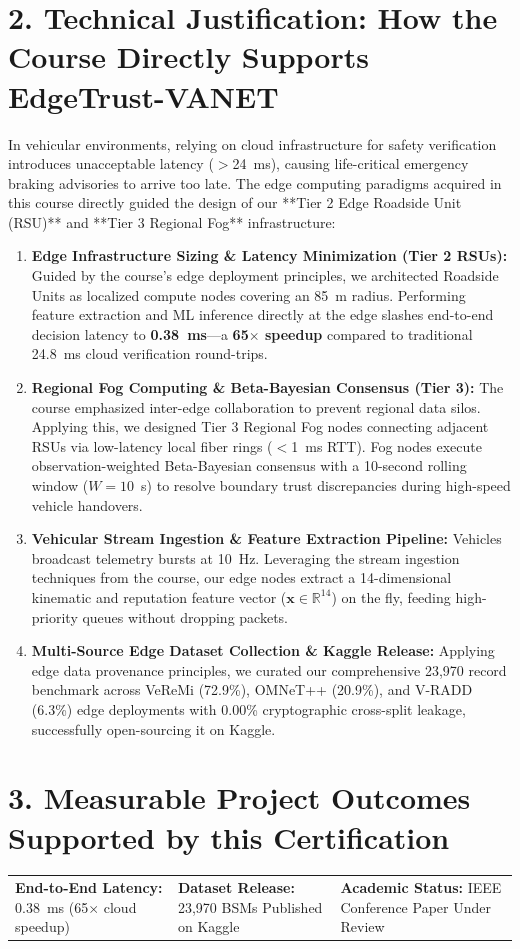 \documentclass[10pt,a4paper]{article}
\begin{document}
\section*{2. Technical Justification: How the Course Directly Supports EdgeTrust-VANET}
In vehicular environments, relying on cloud infrastructure for safety verification introduces unacceptable latency ($>$24~ms), causing life-critical emergency braking advisories to arrive too late. The edge computing paradigms acquired in this course directly guided the design of our **Tier 2 Edge Roadside Unit (RSU)** and **Tier 3 Regional Fog** infrastructure:

\begin{enumerate}
    \item \textbf{Edge Infrastructure Sizing \& Latency Minimization (Tier 2 RSUs):} 
    Guided by the course's edge deployment principles, we architected Roadside Units as localized compute nodes covering an 85~m radius. Performing feature extraction and ML inference directly at the edge slashes end-to-end decision latency to \textbf{0.38~ms}---a \textbf{65$\times$ speedup} compared to traditional 24.8~ms cloud verification round-trips.

    \item \textbf{Regional Fog Computing \& Beta-Bayesian Consensus (Tier 3):} 
    The course emphasized inter-edge collaboration to prevent regional data silos. Applying this, we designed Tier 3 Regional Fog nodes connecting adjacent RSUs via low-latency local fiber rings ($<$1~ms RTT). Fog nodes execute observation-weighted Beta-Bayesian consensus with a 10-second rolling window ($W = 10$~s) to resolve boundary trust discrepancies during high-speed vehicle handovers.

    \item \textbf{Vehicular Stream Ingestion \& Feature Extraction Pipeline:} 
    Vehicles broadcast telemetry bursts at 10~Hz. Leveraging the stream ingestion techniques from the course, our edge nodes extract a 14-dimensional kinematic and reputation feature vector ($\mathbf{x} \in \mathbb{R}^{14}$) on the fly, feeding high-priority queues without dropping packets.

    \item \textbf{Multi-Source Edge Dataset Collection \& Kaggle Release:} 
    Applying edge data provenance principles, we curated our comprehensive 23,970 record benchmark across VeReMi (72.9\%), OMNeT++ (20.9\%), and V-RADD (6.3\%) edge deployments with 0.00\% cryptographic cross-split leakage, successfully open-sourcing it on Kaggle.
\end{enumerate}

\section*{3. Measurable Project Outcomes Supported by this Certification}
\noindent
\begin{tabularx}{\textwidth}{@{}X X X@{}}
    \textbf{End-to-End Latency:} 0.38~ms (65$\times$ cloud speedup) & 
    \textbf{Dataset Release:} 23,970 BSMs Published on Kaggle & 
    \textbf{Academic Status:} IEEE Conference Paper Under Review \\
\end{tabularx}
\end{document}
